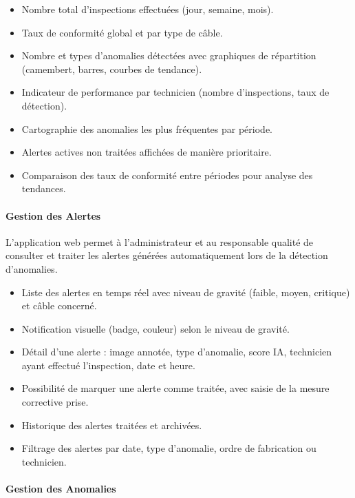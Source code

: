 \begin{itemize}
    \item Nombre total d'inspections effectuées (jour, semaine, mois).
    \item Taux de conformité global et par type de câble.
    \item Nombre et types d'anomalies détectées avec graphiques de répartition (camembert, barres, courbes de tendance).
    \item Indicateur de performance par technicien (nombre d'inspections, taux de détection).
    \item Cartographie des anomalies les plus fréquentes par période.
    \item Alertes actives non traitées affichées de manière prioritaire.
    \item Comparaison des taux de conformité entre périodes pour analyse des tendances.
\end{itemize}

\paragraph{Gestion des Alertes}

L'application web permet à l'administrateur et au responsable qualité de consulter et traiter les alertes générées automatiquement lors de la détection d'anomalies.

\begin{itemize}
    \item Liste des alertes en temps réel avec niveau de gravité (faible, moyen, critique) et câble concerné.
    \item Notification visuelle (badge, couleur) selon le niveau de gravité.
    \item Détail d'une alerte : image annotée, type d'anomalie, score IA, technicien ayant effectué l'inspection, date et heure.
    \item Possibilité de marquer une alerte comme traitée, avec saisie de la mesure corrective prise.
    \item Historique des alertes traitées et archivées.
    \item Filtrage des alertes par date, type d'anomalie, ordre de fabrication ou technicien.
\end{itemize}

\paragraph{Gestion des Anomalies}

